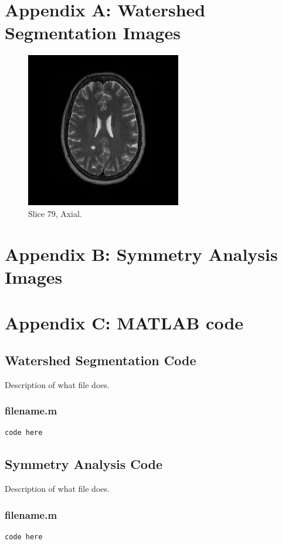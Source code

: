 \documentclass[12pt]{article}
\theoremstyle{plain}%
\theoremstyle{definition}
\theoremstyle{remark}
\begin{document}
\section{Appendix A: Watershed Segmentation Images}
\begin{figure}[!h]
	\centering
		\includegraphics{original.jpg}
	\caption{Slice 79, Axial.}
\end{figure}

\section{Appendix B: Symmetry Analysis Images}


\section{Appendix C: MATLAB code}
\subsection{Watershed Segmentation Code}
Description of what file does.
\subsubsection{filename.m}
\begin{verbatim}
code here
\end{verbatim}

\subsection{Symmetry Analysis Code}
Description of what file does.
\subsubsection{filename.m}
\begin{verbatim}
code here
\end{verbatim}
\end{document}
